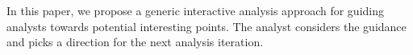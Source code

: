 


In this paper, we propose a generic interactive analysis approach for guiding analysts towards potential interesting points. The analyst considers the guidance and picks a direction for the next analysis iteration. 

